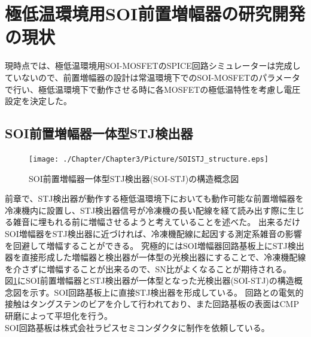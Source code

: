 \section{極低温環境用SOI前置増幅器の研究開発の現状}
	現時点では、極低温環境用SOI-MOSFETのSPICE回路シミュレーターは完成していないので、前置増幅器の設計は常温環境下でのSOI-MOSFETのパラメータで行い、極低温環境下で動作させる時に各MOSFETの極低温特性を考慮し電圧設定を決定した。
	\subsection{SOI前置増幅器一体型STJ検出器}
		\begin{figure}[htbp]
			\begin{center}
				\texttt{[image: ./Chapter/Chapter3/Picture/SOISTJ\_structure.eps]}
				\caption{SOI前置増幅器一体型STJ検出器(SOI-STJ)の構造概念図}
				\label{fig:SOISTJ_structure}
			\end{center}
		\end{figure}
		前章で、STJ検出器が動作する極低温環境下においても動作可能な前置増幅器を冷凍機内に設置し、STJ検出器信号が冷凍機の長い配線を経て読み出す際に生じる雑音に埋もれる前に増幅させるようと考えていることを述べた。
		出来るだけSOI増幅器をSTJ検出器に近づければ、冷凍機配線に起因する測定系雑音の影響を回避して増幅することができる。
		究極的にはSOI増幅器回路基板上にSTJ検出器を直接形成した増幅器と検出器が一体型の光検出器にすることで、冷凍機配線を介さずに増幅することが出来るので、SN比がよくなることが期待される。\\
		図\ref{fig:SOISTJ_structure}にSOI前置増幅器とSTJ検出器が一体型となった光検出器(SOI-STJ)の構造概念図を示す。SOI回路基板上に直接STJ検出器を形成している。
		回路との電気的接触はタングステンのビアを介して行われており、また回路基板の表面はCMP研磨によって平坦化を行う。\\
		SOI回路基板は株式会社ラピスセミコンダクタに制作を依頼している。
